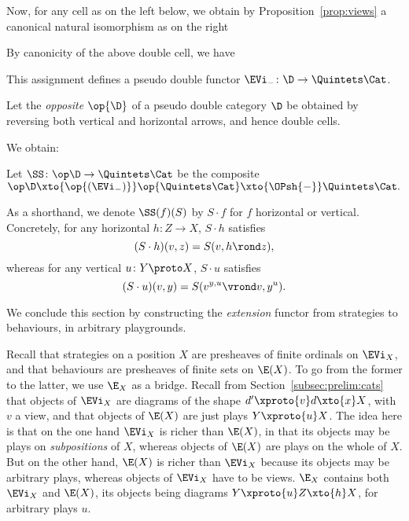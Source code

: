 \documentclass{LMCS}
\theoremstyle{plain}\newtheorem{satz}[thm]{Satz}
\begin{document}
   Now, for any cell as on the left below,
   we obtain by Proposition~\ref{prop:views} a canonical natural isomorphism as on the right
     By canonicity of the above double cell, we have
   \begin{prop}\label{prop:pseudodoublefunctor}
     This assignment defines a pseudo double functor $\EVi_{-} \colon
     \D \to \Quintets\Cat$.
   \end{prop}

   \begin{defi}
     Let the \emph{opposite} $\op{\D}$ of a pseudo double category
     $\D$ be obtained by reversing both vertical and horizontal
     arrows, and hence double cells.
   \end{defi}


   We obtain:
   \begin{defi}\label{def:SSfunctor}
     Let $\SS \colon \op\D \to \Quintets\Cat$ be the composite
     $\op\D \xto{\op{(\EVi_{-})}} \op{\Quintets\Cat} \xto{\OPsh{-}} \Quintets\Cat.$
   \end{defi}
   As a shorthand, we denote $\SS (f) (S)$ by $S \cdot f$ for $f$
   horizontal or vertical.  Concretely, for any horizontal $h \colon Z
   \to X$, $S \cdot h$ satisfies $$(S \cdot h) (v,z) = S(v,h
   \rond z),$$ whereas for any vertical $u \colon Y \proto X$, $S
   \cdot u$ satisfies
   $$(S \cdot u) (v,y) = S (v^{y,u} \vrond v, y^u).$$




We conclude this section by constructing the \emph{extension}
functor from strategies to behaviours, in arbitrary playgrounds.

Recall that strategies on a position $X$ are presheaves of finite
ordinals on $\EVi_X$, and that behaviours are presheaves of finite
sets on $\E(X)$.  To go from the former to the latter, we use $\E_X$
as a bridge.  Recall from Section~\ref{subsec:prelim:cats} that
objects of $\EVi_X$ are diagrams of the shape $d' \xproto{v} d \xto{x}
X$, with $v$ a view, and that objects of $\E(X)$ are just plays $Y
\xproto{u} X$. The idea here is that on the one hand $\EVi_X$ is richer
than $\E(X)$, in that its objects may be plays on \emph{subpositions}
of $X$, whereas objects of $\E(X)$ are plays on the whole of $X$.  But
on the other hand, $\E(X)$ is richer than $\EVi_X$ because its objects
may be arbitrary plays, whereas objects of $\EVi_X$ have to be
views. $\E_X$ contains both $\EVi_X$ and $\E(X)$, its objects
being diagrams $Y \xproto{u} Z \xto{h} X$, for arbitrary plays $u$.
\end{document}
